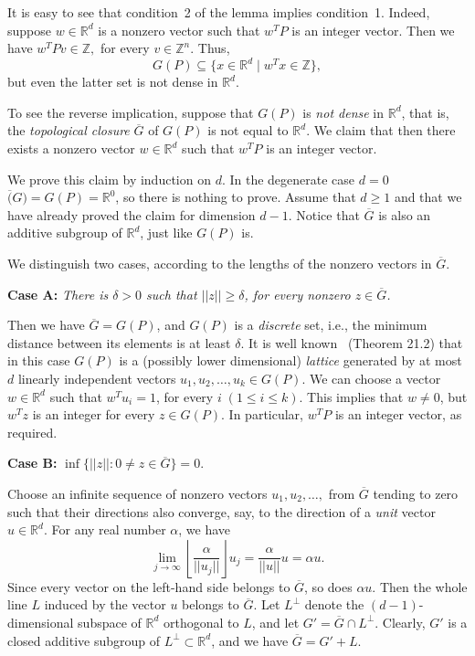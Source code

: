 \documentclass{article}
\theoremstyle{definition}
\newcommand{\R}{\mathbb R}
\newcommand{\Z}{\mathbb Z}
\begin{document}
It is easy to see that condition~2 of the lemma implies condition~1. Indeed, suppose $w\in\R^d$ is a nonzero vector such that $w^TP$ is an integer vector. Then we have $w^TPv\in\Z,$ for every $v\in\Z^n$. Thus, $$G(P)\subseteq\{x\in\R^d\mid w^Tx\in\Z\},$$ but even the latter set is not dense in $\R^d$.
\medskip

To see the reverse implication, suppose that $G(P)$ is \emph{not dense} in $\R^d$, that is, the \emph{topological closure} $\overline{G}$ of $G(P)$ is not equal to $\R^d$. We claim that then there exists a nonzero vector $w\in\R^d$ such that $w^TP$ is an integer vector.

We prove this claim by induction on $d$. In the degenerate case $d=0$ $\overline(G)=G(P)=\R^0$, so there is nothing to prove. Assume that $d\ge1$ and that we have already proved the claim for dimension $d-1$. Notice that $\overline{G}$ is also an additive subgroup of $\R^d$, just like $G(P)$ is.

We distinguish two cases, according to the lengths of the nonzero vectors in $\overline{G}$.
\medskip

\noindent\textbf{Case A:} \emph{There is $\delta>0$ such that $||z||\ge\delta$, for every nonzero $z\in \overline{G}$.}

Then we have $\overline{G}=G(P)$, and $G(P)$ is a \emph{discrete} set, i.e., the minimum distance between its elements is at least $\delta$. It is well known~\cite{Gr07} (Theorem 21.2) that in this case $G(P)$ is a (possibly lower dimensional) \emph{lattice} generated by at most $d$ linearly independent vectors $u_1, u_2,\ldots, u_k\in G(P)$. We can choose a vector $w\in\R^d$ such that $w^Tu_i=1$, for every $i\; (1\le i\le k)$. This implies that $w\ne0$, but $w^Tz$ is an integer for every $z\in G(P)$. In particular, $w^TP$ is an integer vector, as required.
\medskip

\noindent\textbf{Case B:} $\inf\{||z|| : 0\neq z\in \overline{G}\}=0$.

Choose an infinite sequence of nonzero vectors $u_1, u_2,\ldots,$ from $\overline{G}$ tending to zero such that their directions also converge, say, to the direction of a \emph{unit} vector $u\in \R^d$.  For any real number $\alpha$, we have
$$\lim_{j\rightarrow\infty}\left\lfloor\frac{\alpha}{||u_j||}\right\rfloor u_j=\frac{\alpha}{||u||} u= \alpha u.$$
Since every vector on the left-hand side belongs to $\overline{G}$, so does $\alpha u$. Then the whole line $L$ induced by the vector $u$ belongs to $\overline{G}$. Let $L^{\perp}$ denote the $(d-1)$-dimensional subspace of $\R^d$ orthogonal to $L$, and let $G'=\overline{G}\cap L^{\perp}.$ Clearly, $G'$ is a closed additive subgroup of $L^{\perp}\subset\R^d$, and we have $\overline{G}=G'+L$.
\end{document}
